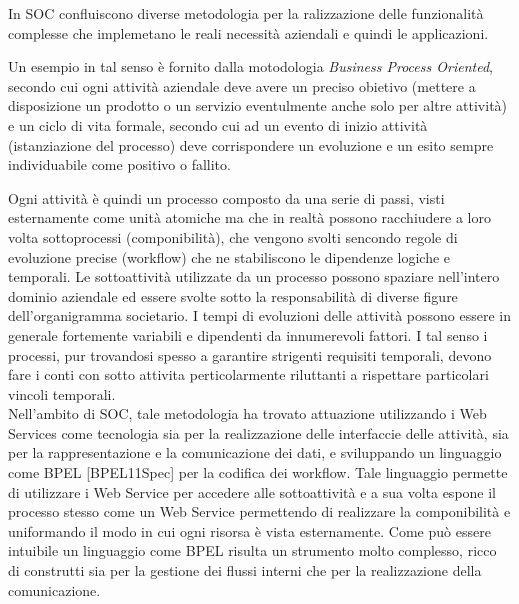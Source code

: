 
In SOC confluiscono diverse metodologia per la ralizzazione delle funzionalità
complesse che implemetano le reali necessità aziendali e quindi le applicazioni.

Un esempio in tal senso è fornito dalla motodologia \emph{Business Process
Oriented}, secondo cui ogni attività aziendale deve avere un
preciso obietivo (mettere a disposizione un prodotto o un servizio eventulmente
anche solo per altre attività) e un ciclo di vita formale, secondo cui ad un
evento di inizio attività (istanziazione del processo) deve corrispondere un
evoluzione e un esito sempre individuabile come positivo o fallito.

Ogni attività è quindi un processo composto da una serie di passi, visti
esternamente come unità atomiche ma che in realtà possono racchiudere a loro
volta sottoprocessi (componibilità), che vengono svolti sencondo regole di
evoluzione precise (workflow) che ne stabiliscono le dipendenze logiche e
temporali. Le sottoattività utilizzate da un processo possono spaziare
nell'intero dominio aziendale ed essere svolte sotto la responsabilità di diverse
figure dell'organigramma societario. I tempi di evoluzioni delle attività possono
essere in generale fortemente variabili e dipendenti da innumerevoli fattori. I
tal senso i processi, pur trovandosi spesso a garantire strigenti requisiti
temporali, devono fare i conti con sotto attivita perticolarmente riluttanti a
rispettare particolari vincoli temporali.
\\

Nell'ambito di SOC, tale metodologia ha trovato attuazione utilizzando i Web
Services come tecnologia sia per la realizzazione delle interfaccie delle
attività, sia per la rappresentazione e la comunicazione dei dati, e
sviluppando un linguaggio come BPEL [BPEL11Spec] per la codifica dei workflow.
Tale linguaggio permette di utilizzare i Web Service per accedere alle
sottoattività e a sua volta espone il processo stesso come un Web Service
permettendo di realizzare la componibilità e uniformando il modo in cui ogni
risorsa è vista esternamente. Come può essere intuibile un linguaggio come BPEL
risulta un strumento molto complesso, ricco di construtti sia per la gestione dei
flussi interni che per la realizzazione della comunicazione.

